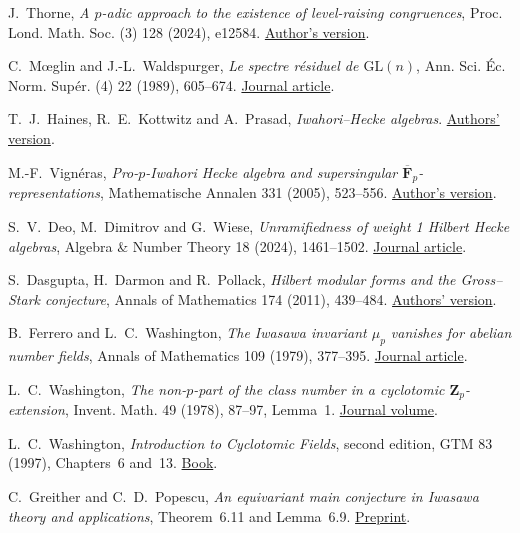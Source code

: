 J.~Thorne,
\emph{A \(p\)-adic approach to the existence of level-raising
congruences}, Proc. Lond. Math. Soc. (3) 128 (2024), e12584.
\href{https://arxiv.org/abs/2212.03591}{Author's version}.

C.~M{\oe}glin and J.-L.~Waldspurger,
\emph{Le spectre r\'esiduel de \(\mathrm{GL}(n)\)},
Ann. Sci. \'{E}c. Norm. Sup\'er. (4) 22 (1989), 605--674.
\href{https://www.numdam.org/item/ASENS_1989_4_22_4_605_0/}{Journal article}.

T.~J.~Haines, R.~E.~Kottwitz and A.~Prasad,
\emph{Iwahori--Hecke algebras}.
\href{https://arxiv.org/abs/math/0309168}{Authors' version}.

M.-F.~Vign\'eras,
\emph{Pro-\(p\)-Iwahori Hecke algebra and supersingular
\(\overline{\mathbf F}_p\)-representations},
Mathematische Annalen 331 (2005), 523--556.
\href{https://perso.imj-prg.fr/wp-content/uploads/vigneras-pub/mathannalen.pdf}{Author's version}.

S.~V.~Deo, M.~Dimitrov and G.~Wiese,
\emph{Unramifiedness of weight 1 Hilbert Hecke algebras},
Algebra \& Number Theory 18 (2024), 1461--1502.
\href{https://msp.org/ant/2024/18-8/ant-v18-n8-p02-s.pdf}{Journal article}.

S.~Dasgupta, H.~Darmon and R.~Pollack,
\emph{Hilbert modular forms and the Gross--Stark conjecture},
Annals of Mathematics 174 (2011), 439--484.
\href{https://sites.math.duke.edu/~dasgupta/papers/Dasgupta-Darmon-Pollack.pdf}{Authors' version}.

B.~Ferrero and L.~C.~Washington,
\emph{The Iwasawa invariant \(\mu_p\) vanishes for abelian number fields},
Annals of Mathematics 109 (1979), 377--395.
\href{https://doi.org/10.2307/1971116}{Journal article}.

L.~C.~Washington, \emph{The non-\(p\)-part of the class number
in a cyclotomic \(\mathbf Z_p\)-extension}, Invent. Math. 49
(1978), 87--97, Lemma~1.
\href{https://gdz.sub.uni-goettingen.de/download/pdf/PPN356556735_0049/PPN356556735_0049.pdf}{Journal volume}.

L.~C.~Washington, \emph{Introduction to Cyclotomic Fields},
second edition, GTM 83 (1997), Chapters~6 and~13.
\href{https://doi.org/10.1007/978-1-4612-1934-7}{Book}.

C.~Greither and C.~D.~Popescu,
\emph{An equivariant main conjecture in Iwasawa theory and applications},
Theorem~6.11 and Lemma~6.9.
\href{https://arxiv.org/abs/1103.3069}{Preprint}.

